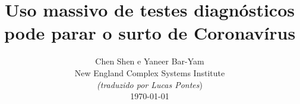 \documentclass[onecolumn,journal]{IEEEtran}
\begin{document}
\title{\color{Brown} Uso massivo de testes diagnósticos pode parar o surto de Coronavírus \\
\vspace{-0.35ex}}
\author{Chen Shen e Yaneer Bar-Yam \\ New England Complex Systems Institute \\
\vspace{+0.35ex}
\small{\textit{(traduzido por Lucas Pontes})}\\
 \today
  \vspace{-14ex} \\


\bigskip
\bigskip

\textbf{}
 }

\maketitle


\flushbottom %



\thispagestyle{empty} %




\renewcommand{\thefootnote}{\fnsymbol{footnote}}
\end{document}
